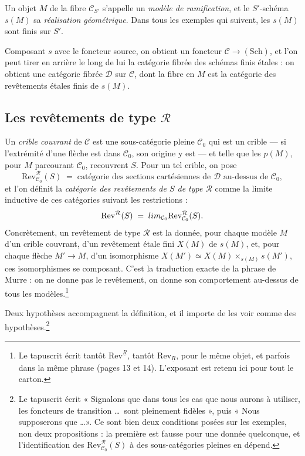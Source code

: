 \documentclass[11pt,a4paper]{article}
\begin{document}
Un objet $M$ de la fibre $\mathcal{C}_{S'}$ s'appelle un \emph{modèle de
ramification}, et le $S'$-schéma $s(M)$ sa \emph{réalisation géométrique}. Dans
tous les exemples qui suivent, les $s(M)$ sont finis sur $S'$.

Composant $s$ avec le foncteur source, on obtient un foncteur
$\mathcal{C} \to (\mathrm{Sch})$, et l'on peut tirer en arrière le long de lui
la catégorie fibrée des schémas finis étales : on obtient une catégorie fibrée
$\mathcal{D}$ sur $\mathcal{C}$, dont la fibre en $M$ est la catégorie des
revêtements étales finis de $s(M)$.

\subsection*{Les revêtements de type $\mathcal{R}$}

Un \emph{crible couvrant} de $\mathcal{C}$ est une sous-catégorie pleine
$\mathcal{C}_{0}$ qui est un crible --- si l'extrémité d'une flèche est dans
$\mathcal{C}_{0}$, son origine y est --- et telle que les $p(M)$, pour $M$
parcourant $\mathcal{C}_{0}$, recouvrent $S$. Pour un tel crible, on pose
\[
  \mathrm{Rev}^{\mathcal{R}}_{\mathcal{C}_{0}}(S) \;=\;
  \text{catégorie des sections cartésiennes de } \mathcal{D}
  \text{ au-dessus de } \mathcal{C}_{0} ,
\]
et l'on définit la \emph{catégorie des revêtements de $S$ de type
$\mathcal{R}$} comme la limite inductive de ces catégories suivant les
restrictions :
\[
  \mathrm{Rev}^{\mathcal{R}}(S) \;=\;
  \varinjlim_{\mathcal{C}_{0}} \mathrm{Rev}^{\mathcal{R}}_{\mathcal{C}_{0}}(S) .
\]
Concrètement, un revêtement de type $\mathcal{R}$ est la donnée, pour chaque
modèle $M$ d'un crible couvrant, d'un revêtement étale fini $X(M)$ de $s(M)$,
et, pour chaque flèche $M' \to M$, d'un isomorphisme
$X(M') \simeq X(M) \times_{s(M)} s(M')$, ces isomorphismes se composant.
C'est la traduction exacte de la phrase de Murre : on ne donne pas le
revêtement, on donne son comportement au-dessus de tous les
modèles.\footnote{Le tapuscrit écrit tantôt
$\mathrm{Rev}^{\underline{R}}$, tantôt $\mathrm{Rev}_{\underline{R}}$, pour le
même objet, et parfois dans la même phrase (pages 13 et 14). L'exposant est
retenu ici pour tout le carton.}

Deux hypothèses accompagnent la définition, et il importe de les voir comme des
hypothèses.\footnote{Le tapuscrit écrit « Signalons que dans tous les cas que
nous aurons à utiliser, les foncteurs de transition \dots\ sont pleinement
fidèles », puis « Nous supposerons que \dots ». Ce sont bien deux conditions
posées sur les exemples, non deux propositions : la première est fausse pour
une donnée quelconque, et l'identification des
$\mathrm{Rev}^{\mathcal{R}}_{\mathcal{C}_{0}}(S)$ à des sous-catégories pleines
en dépend.}
\end{document}
